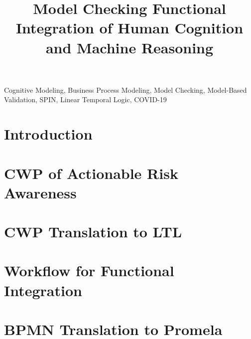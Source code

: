 \documentclass[conference]{IEEEtran}
\begin{document}
\title{
  Model Checking Functional Integration of Human Cognition and Machine Reasoning
}

\author{
\and
{}
\and
{}
}

\maketitle

\begin{abstract}
    
\end{abstract}

\begin{IEEEkeywords}
    Cognitive Modeling, Business Process Modeling, Model Checking, Model-Based Validation, SPIN, Linear Temporal Logic, COVID-19
\end{IEEEkeywords}

\section{Introduction}


\section{CWP of Actionable Risk Awareness}


\section{CWP Translation to LTL}


\section{Workflow for Functional Integration}


\section{BPMN Translation to Promela}
\label{sec:bpmn}

\end{document}

